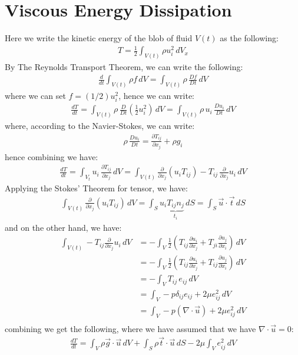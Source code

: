 \documentclass[11pt]{book}
\theoremstyle{break}
\theoremstyle{break}
\newcommand{\pd}{\partial}
\begin{document}
\section[Viscous Energy Dissipation]{\color{red} Viscous Energy Dissipation\color{black}}
Here we write the kinetic energy of the blob of fluid $V(t)$ as the following:
\begin{align*}
T = \frac{1}{2}\int_{V(t)}\rho u_i^2 \, dV_x
\end{align*}
By The Reynolds Transport Theorem, we can write the following:
\begin{align*}
\frac{d}{dt}\int_{V(t)}\rho f \, dV = \int_{V(t)}\rho\, \frac{Df}{Dt}\, dV
\end{align*}
where we can set $f = (1/2) u_i^2$, hence we can write:
\begin{align*}
\frac{dT}{dt} = \int_{V(t)}\rho \, \frac{D}{Dt}\left( \frac{1}{2}u_i^2 \right) \, dV = \int_{V(t)} \rho \, u_i \, \frac{Du_i}{Dt}\, dV
\end{align*}
where, according to the Navier-Stokes, we can write:
\begin{align*}
\rho\,\frac{Du_i}{Dt} = \frac{\pd T_{ij}}{\pd x_j}+\rho g_i
\end{align*}
hence combining we have:
\begin{align*}
\frac{dT}{dt}= \int_{V_t }u_i \, \frac{\pd T_{ij}}{\pd x_j}\, dV = \int_{V(t)} \frac{\pd}{\pd x_j}\left( u_i T_{ij}\right) - T_{ij}\, \frac{\pd}{\pd x_j}u_i\, dV
\end{align*}
Applying the Stokes' Theorem for tensor, we have:
\begin{align*}
\int_{V(t)} \frac{\pd}{\pd x_j}\left( u_i T_{ij}\right) \, dV = \int_S u_i \underbrace{T_{ij}n_j}_{t_i} \, dS = \int_S \vec{u}\cdot \vec{t}\, dS
\end{align*}
and on the other hand, we have:
\begin{align*}
\int_{V(t)} - T_{ij}\frac{\pd}{\pd x_j}u_i \, dV &= -\int_V \frac{1}{2}\left( T_{ij}\frac{\pd u_i }{\pd x_j}+ T_{ji}\frac{\pd u_j}{\pd x_i}\right)\, dV\\
&= -\int_V \frac{1}{2}\left( T_{ij}\frac{\pd u_i }{\pd x_j}+ T_{ij}\frac{\pd u_j}{\pd x_i}\right)\, dV\\
&= -\int_V T_{ij}\, e_{ij}\, dV\\
&= \int_V -p \delta_{ij}e_{ij}+2\mu e_{ij}^2\, dV\\
&= \int_V -p (\nabla \cdot \vec{u})+2\mu e_{ij}^2\, dV\\
\end{align*}
combining we get the following, where we have assumed that we have $\nabla \cdot \vec{u} = 0$:
\begin{align*}
\frac{dT}{dt} = \int_{V} \rho \vec{g}\cdot \vec{u}\, dV + \int_S \rho \vec{t}\cdot \vec{u}\, dS- 2\mu\int_V e_{ij}^2\,  dV
\end{align*}
\end{document}
